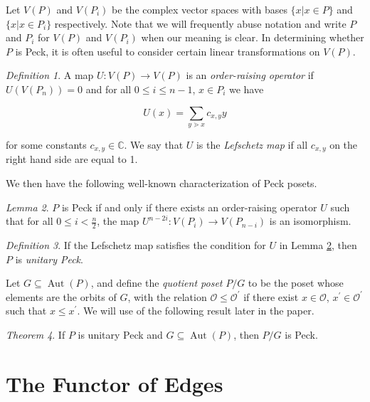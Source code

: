 \documentclass[10 pt]{amsart}
\theoremstyle{plain}
\theoremstyle{definition}
\theoremstyle{remark}
\numberwithin{equation}{section}
\newtheorem{thm}{Theorem}[section]
\newtheorem{lem}[thm]{Lemma}
\theoremstyle{remark}
\newtheorem{defn}[thm]{Definition}
\begin{document}
Let $V(P)$ and $V(P_i)$ be the complex vector spaces with bases $\{x |x\in P\}$ and $\{x |x\in P_i\}$ respectively.  Note that we will frequently abuse notation and write $P$ and $P_i$ for $V(P)$ and $V(P_i)$ when our meaning is clear.  In determining whether $P$ is Peck, it is often useful to consider certain linear transformations on $V(P)$.

\begin{defn}
A map $U\colon V(P)\rightarrow V(P)$ is an \textit{order-raising operator} if $U(V(P_n)) = 0$ and for all $0\le i\le n-1$, $x\in P_i$ we have

$$U(x) = \sum_{y\gtrdot x} c_{x,y}y$$

\noindent for some constants $c_{x,y}\in \mathbb{C}$.  We say that $U$ is the \textit{Lefschetz map} if all $c_{x,y}$ on the right hand side are equal to 1.
\end{defn}

\noindent We then have the following well-known characterization of Peck posets.

\begin{lem}\label{lem:Peck_poset_characterization}
$P$ is Peck if and only if there exists an order-raising operator $U$ such that for all $0\le i < \frac{n}{2}$, the map $U^{n-2i}\colon V(P_i)\rightarrow V(P_{n-i})$ is an isomorphism.
\end{lem}

\begin{defn}
If the Lefschetz map satisfies the condition for $U$ in Lemma \ref{lem:Peck_poset_characterization}, then $P$ is \textit{unitary Peck}.
\end{defn}


Let $G\subseteq \operatorname{Aut}(P)$, and define the \textit{quotient poset} $P/G$ to be the poset whose elements are the orbits of $G$, with the relation $\mathcal{O}\le \mathcal{O}^\prime$ if there exist $x\in \mathcal{O}$, $x^\prime\in \mathcal{O}^\prime$ such that $x\le x^\prime$.  We will use of the following result later in the paper.

\begin{thm}
\label{thm:quotients_of_unitary_peck_posets}
If $P$ is unitary Peck and $G\subseteq\operatorname{Aut}(P)$, then $P/G$ is Peck.
\end{thm}



\section{The Functor of Edges}
\label{sec:functor_of_edges}
\end{document}
